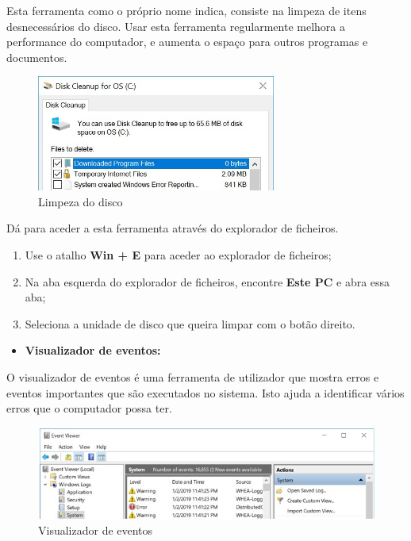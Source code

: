 \documentclass{report}
\begin{document}
Esta ferramenta como o próprio nome indica, consiste na limpeza de itens desnecessários do disco. Usar esta ferramenta regularmente melhora a performance do computador, e aumenta o espaço para outros programas e documentos.

\begin{figure}[h!]
\includegraphics[width=0.7\textwidth]{disk-cleanup.jpg}
\centering
\caption{Limpeza do disco}
\end{figure}

Dá para aceder a esta ferramenta através do explorador de ficheiros.

\begin{enumerate}
    \item Use o atalho \textbf{Win + E} para aceder ao explorador de ficheiros;
    \item Na aba esquerda do explorador de ficheiros, encontre \textbf{Este PC} e abra essa aba;
    \item Seleciona a unidade de disco que queira limpar com o botão direito.
\end{enumerate}

\begin{itemize}
    \item \textbf{Visualizador de eventos:}
\end{itemize}

O visualizador de eventos é uma ferramenta de utilizador que mostra erros e eventos importantes que são executados no sistema. Isto ajuda a identificar vários erros que o computador possa ter.

\begin{figure}[h!]
\includegraphics[width=1\textwidth]{event-viewer.jpg}
\centering
\caption{Visualizador de eventos}
\end{figure}
\end{document}
